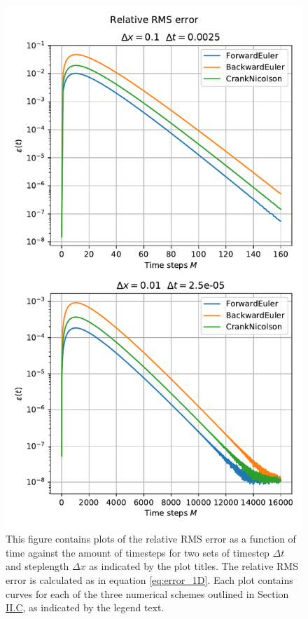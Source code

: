 \documentclass[reprint,english,notitlepage]{revtex4-1}  %
\begin{document}
\begin{figure}[H]
\centering
\includegraphics[width=\columnwidth]{../data/1D-RMS.pdf}
\caption{This figure contains plots of the relative RMS error as a function of time against the amount of timesteps for two sets of timestep $\Delta t$ and steplength $\Delta x$ as indicated by the plot titles. The relative RMS error is calculated as in equation \eqref{eq:error_1D}. Each plot contains curves for each of the three numerical schemes outlined in Section \hyperref[sec:formalism_numerical_1D]{II.C}, as indicated by the legend text.} \label{fig:error_1D}
\end{figure}
\end{document}
